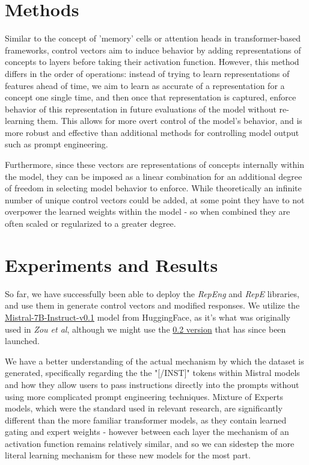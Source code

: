 \documentclass[11pt,a4paper]{article}
\begin{document}
\section{Methods}
Similar to the concept of 'memory' cells or attention heads in transformer-based frameworks, control vectors aim to induce behavior by adding representations of concepts to layers before taking their activation function. However, this method differs in the order of operations: instead of trying to learn representations of features ahead of time, we aim to learn as accurate of a representation for a concept one single time, and then once that representation is captured, enforce behavior of this representation in future evaluations of the model without re-learning them. This allows for more overt control of the model's behavior, and is more robust and effective than additional methods for controlling model output such as prompt engineering.

Furthermore, since these vectors are representations of concepts internally within the model, they can be imposed as a linear combination for an additional degree of freedom in selecting model behavior to enforce. While theoretically an infinite number of unique control vectors could be added, at some point they have to not overpower the learned weights within the model - so when combined they are often scaled or regularized to a greater degree.

\section{Experiments and Results}

So far, we have successfully been able to deploy the \emph{RepEng} and \emph{RepE} libraries, and use them in generate control vectors and modified responses. We utilize the \href{https://huggingface.co/mistralai/Mistral-7B-Instruct-v0.1}{Mistral-7B-Instruct-v0.1} model from HuggingFace, as it's what was originally used in \emph{Zou et al}\cite{zou2023representation}, although we might use the \href{https://huggingface.co/mistralai/Mistral-7B-Instruct-v0.2}{0.2 version} that has since been launched. 

We have a better understanding of the actual mechanism by which the dataset is generated, specifically regarding the the "[/INST]" tokens within Mistral models and how they allow users to pass instructions directly into the prompts without using more complicated prompt engineering techniques. Mixture of Experts models, which were the standard used in relevant research, are significantly different than the more familiar transformer models, as they contain learned gating and expert weights - however between each layer the mechanism of an activation function remains relatively similar, and so we can sidestep the more literal learning mechanism for these new models for the most part.
\end{document}
